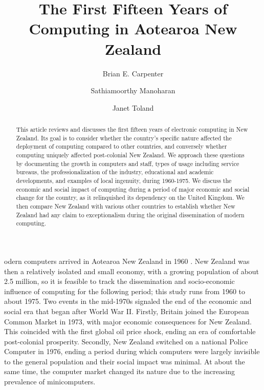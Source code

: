 \documentclass{IEEEcsmag}
\begin{document}

\title{The First Fifteen Years of Computing in Aotearoa New Zealand}

\author{Brian E. Carpenter}

\author{Sathiamoorthy Manoharan}

\author{Janet Toland}




\begin{abstract}
\cbstart
This article reviews and discusses the first fifteen years of electronic computing in New Zealand.
Its goal is to consider whether the country's specific nature affected the deployment of computing compared to other countries, and conversely whether computing uniquely affected post-colonial New Zealand. We approach these questions by documenting  
the growth in computers and staff, types of usage including service bureaus, the professionalization of the industry, educational and academic developments, and examples of local ingenuity, during 1960-1975. We discuss the economic and social impact of computing during a period of major economic and social change for the country, as it relinquished its dependency on the United Kingdom. We then compare New Zealand with various other countries to establish whether New Zealand had any claim to exceptionalism during the original dissemination of modern computing.
\cbend
\end{abstract}


\maketitle


odern computers arrived in Aotearoa New Zealand in 1960 \cite{FirstCinNZ}. 
New Zealand was then a relatively isolated and small economy, with a growing population
of about 2.5 million, so it is feasible to track the dissemination and socio-economic influence
of computing for the following period; this study runs from 1960 to about 1975. Two events
in the mid-1970s signaled the end of the economic and social era that began after World War II.
Firstly, Britain joined the European Common Market in 1973, with major economic consequences
for New Zealand.
\cbstart
This coincided with the first global oil price shock, ending an era of comfortable post-colonial prosperity.
Secondly, New Zealand switched on a national Police Computer in 1976,
ending a period during which computers were largely invisible to the general
population and their social impact was minimal. At about the same time, the computer
market changed its nature due to the increasing prevalence of minicomputers.
\end{document}
